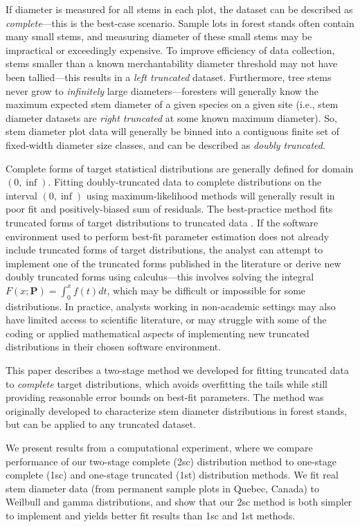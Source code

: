 \documentclass{article}
\begin{document}
If diameter is measured for all stems in each plot, the dataset can be described as \emph{complete}---this is the best-case scenario.
Sample lots in forest stands often contain many small stems, and measuring diameter of these small stems may be impractical or exceedingly expensive.
To improve efficiency of data collection, stems smaller than a known merchantability diameter threshold may not have been tallied---this results in a \emph{left truncated} dataset.
Furthermore, tree stems never grow to \emph{infinitely} large diameters---foresters will generally know the maximum expected stem diameter of a given species on a given site (i.e., stem diameter datasets are \emph{right truncated} at some known maximum diameter).
So, stem diameter plot data will generally be binned into a contiguous finite set of fixed-width diameter size classes, and can be described as \emph{doubly truncated}.

Complete forms of target statistical distributions are generally defined for domain $(0, \inf)$. 
Fitting doubly-truncated data to complete distributions on the interval $(0, \inf)$ using maximum-likelihood methods will generally result in poor fit and positively-biased sum of residuals.
The best-practice method fits truncated forms of target distributions to truncated data \citep{zutter1986characterizing}.
If the software environment used to perform best-fit parameter estimation does not already include truncated forms of target distributions, the analyst can attempt to implement one of the truncated forms published in the literature \citep{mittal1989estimating, hannon1999estimation, hegde1989estimation, ahmad2001moments, wingo1989left} or derive new doubly truncated forms using calculus---this involves solving the integral $F(x; \bm{P}) = \int_0^x f(t) dt$, which may be difficult or impossible for some distributions.
In practice, analysts working in non-academic settings may also have limited access to scientific literature, or may struggle with some of the coding or applied mathematical aspects of implementing new truncated distributions in their chosen software environment.

This paper describes a two-stage method we developed for fitting truncated data to \emph{complete} target distributions, which avoids overfitting the tails while still providing reasonable error bounds on best-fit parameters.
The method was originally developed to characterize stem diameter distributions in forest stands, but can be applied to any truncated dataset.

We present results from a computational experiment, where we compare performance of our two-stage complete (2sc) distribution method to one-stage complete (1sc) and one-stage truncated (1st) distribution methods.
We fit real stem diameter data (from permanent sample plots in Quebec, Canada) to Weilbull and gamma distributions, and show that our 2sc method is both simpler to implement and yields better fit results than 1sc and 1st methods.
\end{document}
